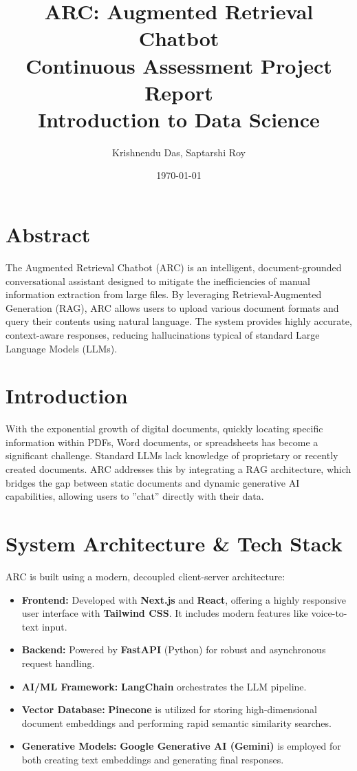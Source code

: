 \documentclass[10pt, a4paper]{article}
\title{\vspace{-1.5cm}\textbf{ARC: Augmented Retrieval Chatbot} \\ \large Continuous Assessment Project Report \\ \normalsize Introduction to Data Science}
\author{Krishnendu Das, Saptarshi Roy}
\date{\today}
\begin{document}
\maketitle
\vspace{-1cm}

\section*{Abstract}
The Augmented Retrieval Chatbot (ARC) is an intelligent, document-grounded conversational assistant designed to mitigate the inefficiencies of manual information extraction from large files. By leveraging Retrieval-Augmented Generation (RAG), ARC allows users to upload various document formats and query their contents using natural language. The system provides highly accurate, context-aware responses, reducing hallucinations typical of standard Large Language Models (LLMs).

\section{Introduction}
With the exponential growth of digital documents, quickly locating specific information within PDFs, Word documents, or spreadsheets has become a significant challenge. Standard LLMs lack knowledge of proprietary or recently created documents. ARC addresses this by integrating a RAG architecture, which bridges the gap between static documents and dynamic generative AI capabilities, allowing users to ''chat'' directly with their data.

\section{System Architecture \& Tech Stack}
ARC is built using a modern, decoupled client-server architecture:
\begin{itemize}[nosep, leftmargin=*]
    \item \textbf{Frontend:} Developed with \textbf{Next.js} and \textbf{React}, offering a highly responsive user interface with \textbf{Tailwind CSS}. It includes modern features like voice-to-text input.
    \item \textbf{Backend:} Powered by \textbf{FastAPI} (Python) for robust and asynchronous request handling.
    \item \textbf{AI/ML Framework:} \textbf{LangChain} orchestrates the LLM pipeline.
    \item \textbf{Vector Database:} \textbf{Pinecone} is utilized for storing high-dimensional document embeddings and performing rapid semantic similarity searches.
    \item \textbf{Generative Models:} \textbf{Google Generative AI (Gemini)} is employed for both creating text embeddings and generating final responses.
\end{itemize}
\end{document}
